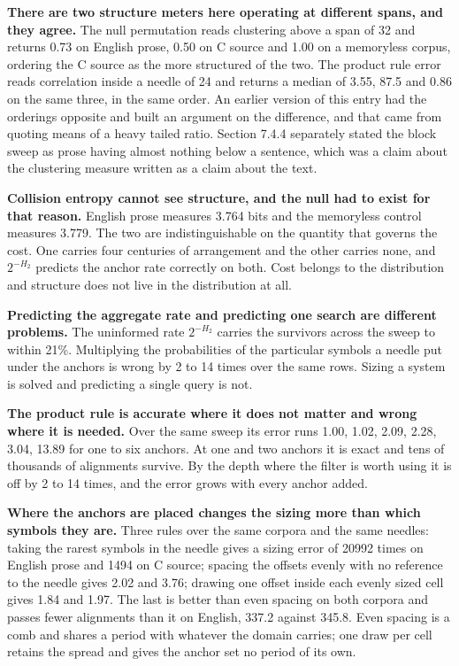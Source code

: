 \textbf{There are two structure meters here operating at different spans, and they agree.} The null permutation reads clustering above a span of 32 and returns 0.73 on English prose, 0.50 on C source and 1.00 on a memoryless corpus, ordering the C source as the more structured of the two. The product rule error reads correlation inside a needle of 24 and returns a median of 3.55, 87.5 and 0.86 on the same three, in the same order. An earlier version of this entry had the orderings opposite and built an argument on the difference, and that came from quoting means of a heavy tailed ratio. Section 7.4.4 separately stated the block sweep as prose having almost nothing below a sentence, which was a claim about the clustering measure written as a claim about the text.

\textbf{Collision entropy cannot see structure, and the null had to exist for that reason.} English prose measures 3.764 bits and the memoryless control measures 3.779. The two are indistinguishable on the quantity that governs the cost. One carries four centuries of arrangement and the other carries none, and \(2^{-H_2}\) predicts the anchor rate correctly on both. Cost belongs to the distribution and structure does not live in the distribution at all.

\textbf{Predicting the aggregate rate and predicting one search are different problems.} The uninformed rate \(2^{-H_2}\) carries the survivors across the sweep to within 21\%. Multiplying the probabilities of the particular symbols a needle put under the anchors is wrong by 2 to 14 times over the same rows. Sizing a system is solved and predicting a single query is not.

\textbf{The product rule is accurate where it does not matter and wrong where it is needed.} Over the same sweep its error runs 1.00, 1.02, 2.09, 2.28, 3.04, 13.89 for one to six anchors. At one and two anchors it is exact and tens of thousands of alignments survive. By the depth where the filter is worth using it is off by 2 to 14 times, and the error grows with every anchor added.

\textbf{Where the anchors are placed changes the sizing more than which symbols they are.} Three rules over the same corpora and the same needles: taking the rarest symbols in the needle gives a sizing error of 20992 times on English prose and 1494 on C source; spacing the offsets evenly with no reference to the needle gives 2.02 and 3.76; drawing one offset inside each evenly sized cell gives 1.84 and 1.97. The last is better than even spacing on both corpora and passes fewer alignments than it on English, 337.2 against 345.8. Even spacing is a comb and shares a period with whatever the domain carries; one draw per cell retains the spread and gives the anchor set no period of its own.

